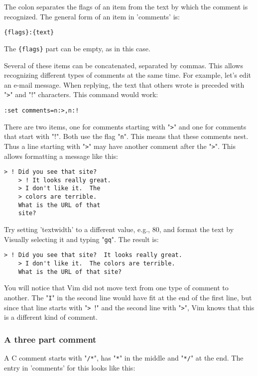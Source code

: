 The colon separates the flags of an item from the text by which the comment is recognized.
The general form of an item in 'comments' is:

\begin{Verbatim}[samepage=true]
    {flags}:{text}
\end{Verbatim}

The \verb!{flags}! part can be empty, as in this case.

Several of these items can be concatenated, separated by commas.
This allows recognizing different types of comments at the same time.
For example, let's edit an e-mail message.
When replying, the text that others wrote is preceded with "\verb!>!" and "\verb!!!" characters.
This command would work:

\begin{Verbatim}[samepage=true]
 :set comments=n:>,n:!
\end{Verbatim}

There are two items, one for comments starting with "\verb!>!" and one for comments that start with "\verb!!!".
Both use the flag "\verb!n!".
This means that these comments nest.
Thus a line starting with "\verb!>!" may have another comment after the "\verb!>!".
This allows formatting a message like this:

\begin{Verbatim}[samepage=true]
    > ! Did you see that site? 
    > ! It looks really great. 
    > I don't like it.  The 
    > colors are terrible. 
    What is the URL of that 
    site? 
\end{Verbatim}

Try setting 'textwidth' to a different value, e.g., 80, and format the text by Visually selecting it and typing "\verb!gq!".
The result is:

\begin{Verbatim}[samepage=true]
    > ! Did you see that site?  It looks really great. 
    > I don't like it.  The colors are terrible. 
    What is the URL of that site? 
\end{Verbatim}

You will notice that Vim did not move text from one type of comment to another.
The "\verb!I!" in the second line would have fit at the end of the first line, but since that line starts with "\verb!> !!" and the second line with "\verb!>!", Vim knows that this is a different kind of comment.

\subsubsection{A three part comment}
A C comment starts with "\verb!/*!", has "\verb!*!" in the middle and "\verb!*/!" at the end.
The entry in 'comments' for this looks like this:

